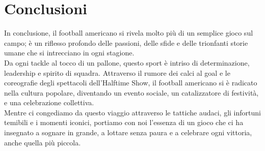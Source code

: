 \documentclass[a4paper, 12pt, oneside]{book}
\begin{document}
	\backmatter
	
	\chapter{Conclusioni}
	In conclusione, il football americano si rivela molto più di un semplice gioco sul campo; è un riflesso profondo delle passioni, delle sfide e delle trionfanti storie umane che si intrecciano in ogni stagione.
	\\Da ogni tackle al tocco di un pallone, questo sport è intriso di determinazione, leadership e spirito di squadra. Attraverso il rumore dei calci al goal e le coreografie degli spettacoli dell'Halftime Show, il football americano si è radicato nella cultura popolare, diventando un evento sociale, un catalizzatore di festività, e una celebrazione collettiva.
	\\Mentre ci congediamo da questo viaggio attraverso le tattiche audaci, gli infortuni temibili e i momenti iconici, portiamo con noi l'essenza di un gioco che ci ha insegnato a sognare in grande, a lottare senza paura e a celebrare ogni vittoria, anche quella più piccola.
	
	\printindex
	
\end{document}
